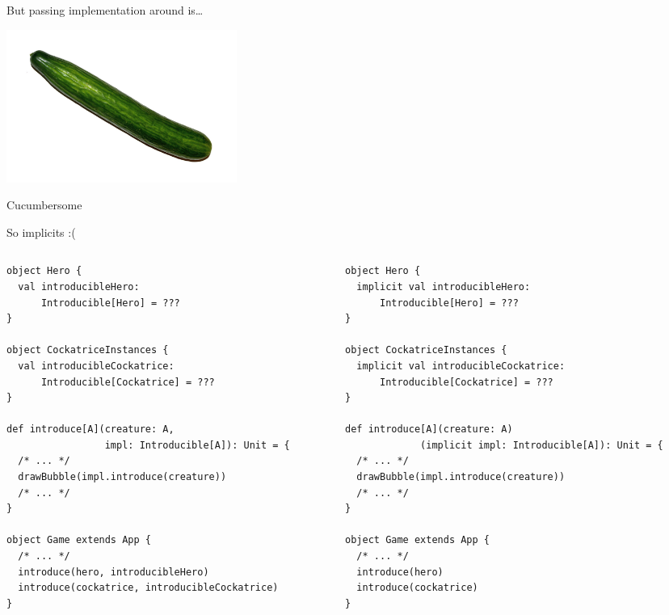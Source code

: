 \documentclass[presentation,aspectratio=169,smaller]{beamer}
\begin{document}
\begin{frame}[label={sec:orge09d67b}]{But passing implementation around is\ldots{}}
\begin{center}
\includegraphics[height=5cm]{images/cucumber.jpg}
\end{center}

Cucumbersome
\end{frame}

\begin{frame}[label={sec:org822eba7},fragile]{So implicits :(}
 \begin{columns}
\begin{column}[t]{0.5\columnwidth}
\begin{verbatim}
object Hero {
  val introducibleHero:
      Introducible[Hero] = ???
}

object CockatriceInstances {
  val introducibleCockatrice:
      Introducible[Cockatrice] = ???
}

def introduce[A](creature: A,
                 impl: Introducible[A]): Unit = {
  /* ... */
  drawBubble(impl.introduce(creature))
  /* ... */
}

object Game extends App {
  /* ... */
  introduce(hero, introducibleHero)
  introduce(cockatrice, introducibleCockatrice)
}
\end{verbatim}

\pause
\end{column}

\begin{column}[t]{0.5\columnwidth}
\begin{verbatim}
object Hero {
  implicit val introducibleHero:
      Introducible[Hero] = ???
}

object CockatriceInstances {
  implicit val introducibleCockatrice:
      Introducible[Cockatrice] = ???
}

def introduce[A](creature: A)
             (implicit impl: Introducible[A]): Unit = {
  /* ... */
  drawBubble(impl.introduce(creature))
  /* ... */
}

object Game extends App {
  /* ... */
  introduce(hero)
  introduce(cockatrice)
}
\end{verbatim}
\end{column}
\end{columns}
\end{frame}
\end{document}
